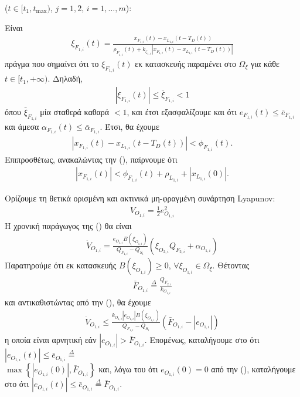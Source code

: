 \begin{proof_of_theorem}
\bigskip
\begin{step}\label{step:1:proof}
($t\in[t_1,t_{\text{max}})$, $j=1,2$, $i=1,\ldots,m$):

\bigskip
Είναι
\begin{align}
\xi_{F_{1, i}}(t) = \frac{x_{F_{1,i}}(t) - x_{L_{1,i}}(t - T_D(t))}{\rho_{F_{1, i}}(t) + k_{\zeta_{1, i}}|x_{F_{1,i}}(t) - x_{L_{1,i}}(t - T_D(t))|} \label{xiF1_proving_its_inside_-1_1}
\end{align}
πράγμα που σημαίνει ότι το $\xi_{F_{1, i}}(t)$ εκ κατασκευής παραμένει στο $\Omega_{\xi}$ για κάθε $t\in[t_1, +\infty)$. Δηλαδή,
\begin{align}
|\xi_{F_{1, i}}(t)| \leq \bar{\xi}_{F_{1, i}} < 1 \label{xiF1abs}
\end{align}
όπου $\bar{\xi}_{F_{1, i}}$ μία σταθερά καθαρά $<1$, και έτσι εξασφαλίζουμε και ότι $e_{F_{1, i}}(t) \leq \bar{e}_{F_{1, i}}$ και άμεσα $\alpha_{F_{1, i}}(t) \leq \bar{\alpha}_{F_{1, i}}$.
Έτσι, θα έχουμε
\begin{align}
\left| x_{F_{1,i}}(t) - x_{L_{1,i}}(t - T_D(t)) \right| < \phi_{F_{1,i}}(t). \label{conclusionF1a}
\end{align}
Επιπροσθέτως, ανακαλώντας την (), παίρνουμε ότι
\begin{align}
\left| x_{F_{1,i}}(t) \right| < \phi_{F_{1, i}}(t) + \rho_{L_{1,i}} + \left| x_{L_{1,i}}(0)\right|. \label{conclusionF1b}
\end{align}

\bigskip
Ορίζουμε τη θετικά ορισμένη και ακτινικά μη-φραγμένη συνάρτηση Lyapunov:
\begin{align}
V_{O_{1,i}} = \frac{1}{2}e^2_{O_{1,i}} \label{VO1}
\end{align}
Η χρονική παράγωγος της () θα είναι
\begin{align}
\dot{V}_{O_{1,i}} = \frac{e_{O_{1, i}}B(\xi_{O_{1, i}})}{Q_{F_{1, i}} - Q_{S_{i}}}\left(\xi_{O_{2, i}}Q_{F_{2, i}} + \alpha_{O_{1, i}}\right)
\end{align}
Παρατηρούμε ότι εκ κατασκευής $B(\xi_{O_{1, i}}) \geq 0$, $\forall\xi_{O_{1,i}}\in\Omega_{\xi}$.
Θέτοντας
\begin{align}
\bar{F}_{O_{1, i}} \stackrel{\Delta}{=} \frac{Q_{F_{2, i}}}{k_{O_{1,i}}}
\end{align}
και αντικαθιστώντας από την (), θα έχουμε
\begin{align}
\dot{V}_{O_{1,i}} \leq \frac{k_{O_{1, i}}|e_{O_{1, i}}|B(\xi_{O_{1, i}})}{Q_{F_{1, i}} - Q_{S_{i}}}\left(\bar{F}_{O_{1, i}} - |e_{O_{1,i}}|\right)
\end{align}
η οποία είναι αρνητική εάν $|e_{O_{1,i}}| > \bar{F}_{O_{1, i}}$. Επομένως, καταλήγουμε στο ότι $\left|e_{O_{1,i}}(t)\right| \leq \bar{e}_{O_{1,i}} \stackrel{\Delta}{=}$ \\ $ \max\left\{ \left|e_{O_{1,i}}(0)\right|, \bar{F}_{O_{1,i}} \right\}$ και, λόγω του ότι $e_{O_{1,i}}(0) = 0$ από την (), καταλήγουμε στο ότι $\left|e_{O_{1,i}}(t)\right| \leq \bar{e}_{O_{1,i}} \stackrel{\Delta}{=}\bar{F}_{O_{1,i}}$.


\end{step}
\end{proof_of_theorem}
